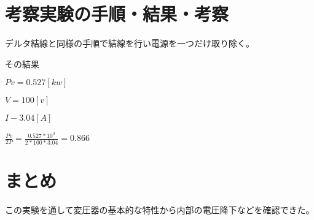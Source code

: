 \documentclass[a4paper,11pt,xelatex,ja=standard]{bxjsarticle}
\begin{document}
\clearpage
            
\section{考察実験の手順・結果・考察}

    デルタ結線と同様の手順で結線を行い電源を一つだけ取り除く。

    その結果

    $Pv = 0.527[kw]$

    $V=100[v]$

    $I-3.04[A]$

    $\frac{Pv}{2P}=\frac{0.527*10^3}{2*100*3.04} = 0.866$

\section{まとめ}

この実験を通して変圧器の基本的な特性から内部の電圧降下などを確認できた。
\end{document}
